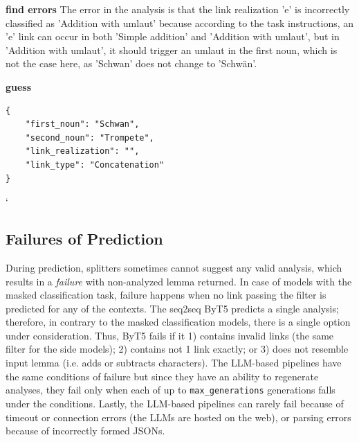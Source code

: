 \documentclass[11pt]{article}
\begin{document}
\begin{center}
\begin{tcolorbox}[colback=gray!10, colframe=black, width=\linewidth, left=1mm, right=1mm, title=Prediction of \texttt{schwan\_trompete} from \textit{Llama-instruct\textsubscript{+cand+par}}, breakable]
        \begin{aimessage}{\textbf{find errors}}
            The error in the analysis is that the link realization 'e' is incorrectly classified as 'Addition with umlaut' because according to the task instructions, an 'e' link can occur in both 'Simple addition' and 'Addition with umlaut', but in 'Addition with umlaut', it should trigger an umlaut in the first noun, which is not the case here, as 'Schwan' does not change to 'Schw{\"a}n'.
        \end{aimessage}
    
        \begin{aimessage}{\textbf{guess}}
            \begin{verbatim}
{
    "first_noun": "Schwan",
    "second_noun": "Trompete",
    "link_realization": "",
    "link_type": "Concatenation"
}
            \end{verbatim}`
        \end{aimessage}
        
    \end{tcolorbox}
\end{center}
\label{chat:schwantrompete}


\subsection{Failures of Prediction}

During prediction, splitters sometimes cannot suggest any valid analysis, which results in a \textit{failure} with non-analyzed lemma returned. In case of models with the masked classification task, failure happens when no link passing the filter is predicted for any of the contexts. The seq2seq ByT5 predicts a single analysis; therefore, in contrary to the masked classification models, there is a single option under consideration. Thus, ByT5 fails if it 1) contains invalid links (the same filter for the side models); 2) contains not 1 link exactly; or 3) does not resemble input lemma (i.e. adds or subtracts characters). The LLM-based pipelines have the same conditions of failure but since they have an ability to regenerate analyses, they fail only when each of up to \texttt{max\_generations} generations falls under the conditions. Lastly, the LLM-based pipelines can rarely fail because of timeout or connection errors (the LLMs are hosted on the web), or parsing errors because of incorrectly formed JSONs.
\end{document}
